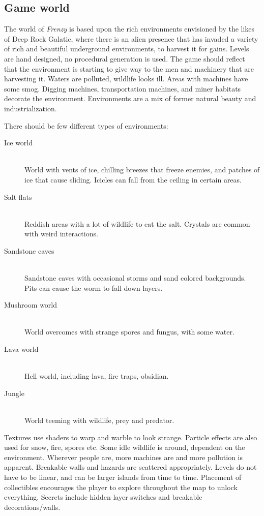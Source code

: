 \documentclass[12pt]{report}
\begin{document}
\pagebreak
\subsection*{Game world}
The world of \emph{Frenzy} is based upon the rich environments envisioned by the likes of 
Deep Rock Galatic, where there is an alien presence that has invaded a variety of rich and
beautiful underground environments, to harvest it for gains. Levels are hand designed, no 
procedural generation is used. The game should reflect that the environment is starting to 
give way to the men and machinery that are harvesting it. Waters are polluted, wildlife 
looks ill. Areas with machines have some smog. Digging machines, transportation machines,
and miner habitats decorate the environment. Environments are a mix of former natural beauty
and industrialization.

There should be few different types of environments:
\begin{description}
    \item [Ice world] \hfill \\ World with vents of ice, chilling breezes that freeze enemies, and patches of ice that cause sliding. Icicles can fall from the ceiling in certain areas.
    \item [Salt flats] \hfill \\ Reddish areas with a lot of wildlife to eat the salt. Crystals are common with weird interactions.
    \item [Sandstone caves] \hfill \\ Sandstone caves with occasional storms and sand colored backgrounds. Pits can cause the worm to fall down layers. 
    \item [Mushroom world] \hfill \\ World overcomes with strange spores and fungus, with some water.
    \item [Lava world] \hfill \\ Hell world, including lava, fire traps, obsidian.
    \item [Jungle] \hfill \\ World teeming with wildlife, prey and predator.
\end{description}

Textures use shaders to warp and warble to look strange. Particle effects are also used
for snow, fire, spores etc. Some idle wildlife is around, dependent on the environment. 
Wherever people are, more machines are and more pollution is apparent. Breakable walls and
hazards are scattered appropriately. Levels do not have to be linear, and can be larger
islands from time to time. Placement of collectibles encourages the player to explore 
throughout the map to unlock everything. Secrets include hidden layer switches and breakable
decorations/walls.
\end{document}
